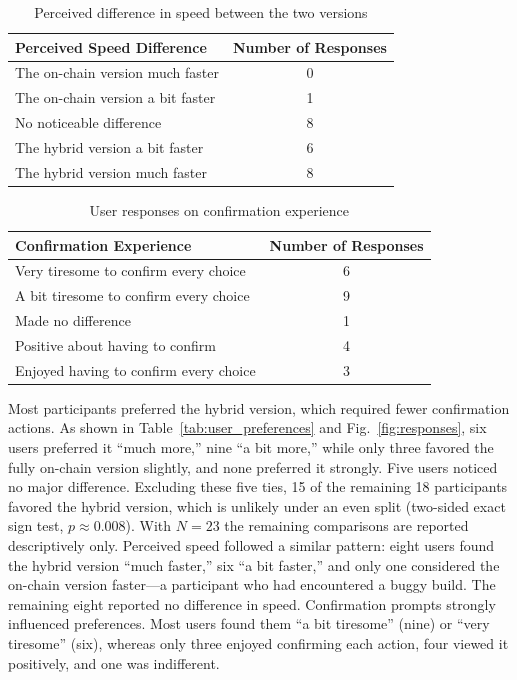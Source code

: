 \documentclass[10pt,conference]{IEEEtran}
\begin{document}
\begin{table}[htbp]
\centering
\caption{Perceived difference in speed between the two versions}
\label{tab:perceived_speed}
\begin{tabular}{lc}
\hline
\textbf{Perceived Speed Difference} & \textbf{Number of Responses} \\
\hline
The on-chain version much faster      & 0 \\
The on-chain version a bit faster     & 1 \\
No noticeable difference           & 8 \\
The hybrid version a bit faster    & 6 \\
The hybrid version much faster     & 8 \\
\hline
\end{tabular}
\end{table}

\begin{table}[htbp]
\centering
\caption{User responses on confirmation experience}
\label{tab:confirmation_experience}
\begin{tabular}{lc}
\hline
\textbf{Confirmation Experience} & \textbf{Number of Responses} \\
\hline
Very tiresome to confirm every choice & 6 \\
A bit tiresome to confirm every choice & 9 \\
Made no difference                    & 1 \\
Positive about having to confirm       & 4 \\
Enjoyed having to confirm every choice & 3 \\
\hline
\end{tabular}
\end{table}

Most participants preferred the hybrid version, which required fewer confirmation actions. As shown in Table~\ref{tab:user_preferences} and Fig.~\ref{fig:responses}, six users preferred it “much more,” nine “a bit more,” while only three favored the fully on-chain version slightly, and none preferred it strongly. Five users noticed no major difference. Excluding these five ties, 15 of the remaining 18 participants favored the hybrid version, which is unlikely under an even split (two-sided exact sign test, $p \approx 0.008$). With $N=23$ the remaining comparisons are reported descriptively only.
%
Perceived speed followed a similar pattern: eight users found the hybrid version “much faster,” six “a bit faster,” and only one considered the on-chain version faster—a participant who had encountered a buggy build. The remaining eight reported no difference in speed.
%
Confirmation prompts strongly influenced preferences. Most users found them “a bit tiresome” (nine) or “very tiresome” (six), whereas only three enjoyed confirming each action, four viewed it positively, and one was indifferent.
\end{document}
